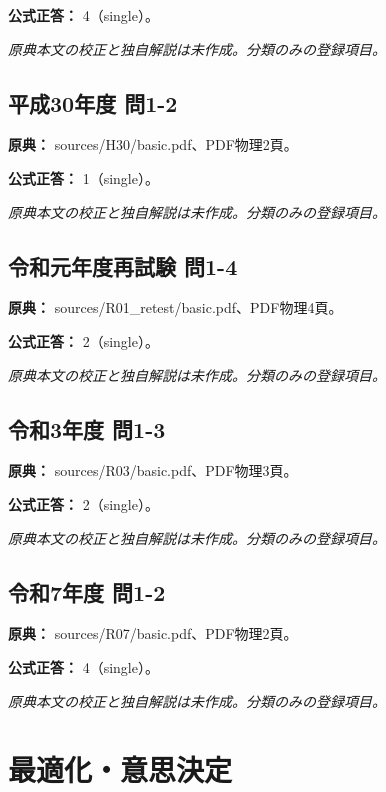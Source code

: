 \textbf{公式正答：} 4（single）。

\par\textit{原典本文の校正と独自解説は未作成。分類のみの登録項目。}

\subsection{平成30年度 問1-2}
\label{q:h30-reg-basic-1-2}

\noindent\textbf{原典：} sources/H30/basic.pdf、PDF物理2頁。

\textbf{公式正答：} 1（single）。

\par\textit{原典本文の校正と独自解説は未作成。分類のみの登録項目。}

\subsection{令和元年度再試験 問1-4}
\label{q:r01-ret-basic-1-4}

\noindent\textbf{原典：} sources/R01\_retest/basic.pdf、PDF物理4頁。

\textbf{公式正答：} 2（single）。

\par\textit{原典本文の校正と独自解説は未作成。分類のみの登録項目。}

\subsection{令和3年度 問1-3}
\label{q:r03-reg-basic-1-3}

\noindent\textbf{原典：} sources/R03/basic.pdf、PDF物理3頁。

\textbf{公式正答：} 2（single）。

\par\textit{原典本文の校正と独自解説は未作成。分類のみの登録項目。}

\subsection{令和7年度 問1-2}
\label{q:r07-reg-basic-1-2}

\noindent\textbf{原典：} sources/R07/basic.pdf、PDF物理2頁。

\textbf{公式正答：} 4（single）。

\par\textit{原典本文の校正と独自解説は未作成。分類のみの登録項目。}

\section{最適化・意思決定}

